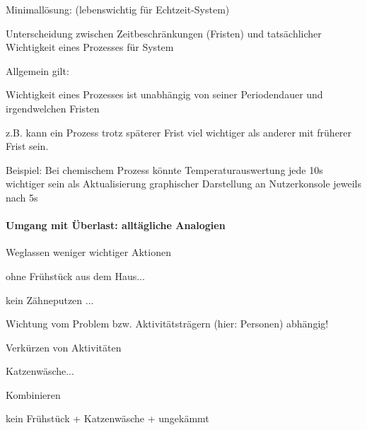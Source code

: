 \documentclass[a4paper]{article}
\begin{document}
\begin{multicols}{3}
    \begin{itemize*}
        \item Minimallösung: (lebenswichtig für Echtzeit-System)
        \begin{itemize*}
            \item Unterscheidung zwischen Zeitbeschränkungen (Fristen) und tatsächlicher Wichtigkeit eines Prozesses für System
        \end{itemize*}
        \item Allgemein gilt:
        \begin{itemize*}
            \item Wichtigkeit eines Prozesses ist unabhängig von seiner Periodendauer und irgendwelchen Fristen
            \item z.B. kann ein Prozess trotz späterer Frist viel wichtiger als anderer mit früherer Frist sein.
            \item Beispiel: Bei chemischem Prozess könnte Temperaturauswertung jede 10s wichtiger sein als Aktualisierung graphischer Darstellung an Nutzerkonsole jeweils nach 5s
        \end{itemize*}
    \end{itemize*}


    \paragraph{Umgang mit Überlast: alltägliche
        Analogien}

    \begin{enumerate*}
        \item Weglassen weniger wichtiger Aktionen
        \begin{itemize*}
            \item ohne Frühstück aus dem Haus...
            \item kein Zähneputzen ...
            \item Wichtung vom Problem bzw. Aktivitätsträgern (hier: Personen) abhängig!
        \end{itemize*}
        \item Verkürzen von Aktivitäten
        \begin{itemize*}
            \item Katzenwäsche...
        \end{itemize*}
        \item Kombinieren
        \begin{itemize*}
            \item kein Frühstück + Katzenwäsche + ungekämmt
        \end{itemize*}
    \end{enumerate*}



\end{multicols}
\end{document}
